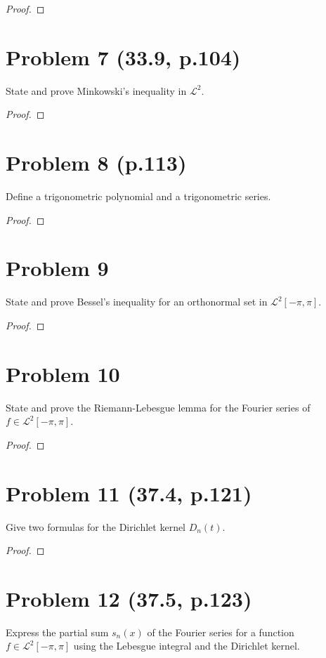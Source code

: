 \documentclass[12pt]{article}
\begin{document}
\begin{proof}
\end{proof}

\section*{Problem 7 (33.9, p.104)}
State and prove Minkowski's inequality in $\mathcal{L}^{2}$.

\begin{proof}
\end{proof}

\section*{Problem 8 (p.113)}
Define a trigonometric polynomial and a trigonometric series.

\begin{proof}
\end{proof}

\section*{Problem 9}
State and prove Bessel's inequality for an orthonormal set in $\mathcal{L}^{2}[-\pi,\pi]$.

\begin{proof}
\end{proof}

\section*{Problem 10}
State and prove the Riemann-Lebesgue lemma for the Fourier series of $f \in \mathcal{L}^{2}[-\pi,\pi]$.

\begin{proof}
\end{proof}

\section*{Problem 11 (37.4, p.121)}
Give two formulas for the Dirichlet kernel $D_{n}(t)$.

\begin{proof}
\end{proof}

\section*{Problem 12 (37.5, p.123)}
Express the partial sum $s_{n}(x)$ of the Fourier series for a function $f \in \mathcal{L}^{2}[-\pi,\pi]$ using the Lebesgue integral and the Dirichlet kernel.
\end{document}
